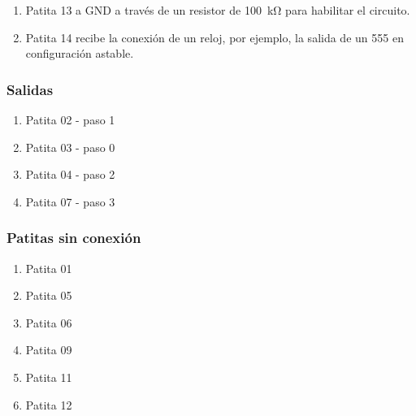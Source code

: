 \documentclass[../principal.tex]{subfiles}
\begin{document}
\begin{enumerate}
    \item Patita 13 a GND a través de un resistor de \qty{100}{\kilo\ohm} para habilitar el circuito.
    \item Patita 14 recibe la conexión de un reloj, por ejemplo, la salida de un 555 en configuración astable.
\end{enumerate}

\subsubsection{Salidas}

\begin{enumerate}
    \item Patita 02 - paso 1
    \item Patita 03 - paso 0
    \item Patita 04 - paso 2
    \item Patita 07 - paso 3

\end{enumerate}

\subsubsection{Patitas sin conexión}

\begin{enumerate}
    \item Patita 01
    \item Patita 05
    \item Patita 06
    \item Patita 09
    \item Patita 11
    \item Patita 12
\end{enumerate}


\newpage
\end{document}
